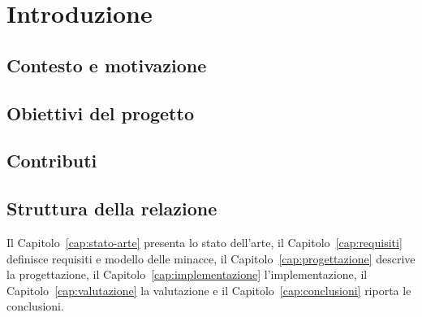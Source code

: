\chapter{Introduzione}
\label{cap:introduzione}

\section{Contesto e motivazione}

\section{Obiettivi del progetto}

\section{Contributi}

\section{Struttura della relazione}
Il Capitolo~\ref{cap:stato-arte} presenta lo stato dell'arte, il Capitolo~\ref{cap:requisiti}
definisce requisiti e modello delle minacce, il Capitolo~\ref{cap:progettazione} descrive la progettazione,
il Capitolo~\ref{cap:implementazione} l'implementazione, il Capitolo~\ref{cap:valutazione} la valutazione
e il Capitolo~\ref{cap:conclusioni} riporta le conclusioni.
